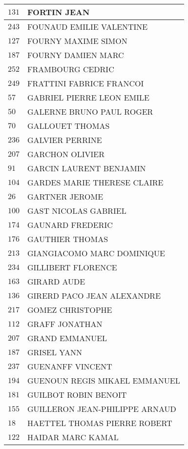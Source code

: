 \begin{xltabular}{\linewidth}{|l|X|}
    \hline
    $131$ & FORTIN JEAN \\
    \hline
    $243$ & FOUNAUD EMILIE VALENTINE \\
    \hline
    $127$ & FOURNY MAXIME SIMON \\
    \hline
    $187$ & FOURNY DAMIEN MARC \\
    \hline
    $252$ & FRAMBOURG CEDRIC \\
    \hline
    $249$ & FRATTINI FABRICE FRANCOI \\
    \hline
    $57$ & GABRIEL PIERRE LEON EMILE \\
    \hline
    $50$ & GALERNE BRUNO PAUL ROGER \\
    \hline
    $70$ & GALLOUET THOMAS \\
    \hline
    $236$ & GALVIER PERRINE \\
    \hline
    $207$ & GARCHON OLIVIER \\
    \hline
    $91$ & GARCIN LAURENT BENJAMIN \\
    \hline
    $104$ & GARDES MARIE THERESE CLAIRE \\
    \hline
    $26$ & GARTNER JEROME \\
    \hline
    $100$ & GAST NICOLAS GABRIEL \\
    \hline
    $174$ & GAUNARD FREDERIC \\
    \hline
    $176$ & GAUTHIER THOMAS \\
    \hline
    $213$ & GIANGIACOMO MARC DOMINIQUE \\
    \hline
    $234$ & GILLIBERT FLORENCE \\
    \hline
    $163$ & GIRARD AUDE \\
    \hline
    $136$ & GIRERD PACO JEAN ALEXANDRE \\
    \hline
    $217$ & GOMEZ CHRISTOPHE \\
    \hline
    $112$ & GRAFF JONATHAN \\
    \hline
    $207$ & GRAND EMMANUEL \\
    \hline
    $187$ & GRISEL YANN \\
    \hline
    $237$ & GUENANFF VINCENT \\
    \hline
    $194$ & GUENOUN REGIS MIKAEL EMMANUEL \\
    \hline
    $181$ & GUILBOT ROBIN BENOIT \\
    \hline
    $155$ & GUILLERON JEAN-PHILIPPE ARNAUD \\
    \hline
    $18$ & HAETTEL THOMAS PIERRE ROBERT \\
    \hline
    $122$ & HAIDAR MARC KAMAL \\

\end{xltabular}
